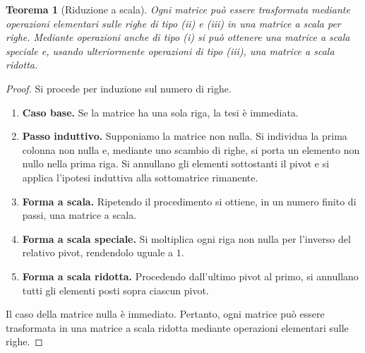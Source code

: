 \documentclass[11pt,a4paper]{article}
\theoremstyle{plain}
\newtheorem{teo}[prop]{Teorema}
\theoremstyle{definition}
\theoremstyle{remark}
\begin{document}
\begin{teo}[Riduzione a scala]
Ogni matrice può essere trasformata mediante operazioni elementari sulle righe di tipo (ii) e (iii) in una matrice a scala per righe. Mediante operazioni anche di tipo (i) si può ottenere una matrice a scala speciale e, usando ulteriormente operazioni di tipo (iii), una matrice a scala ridotta.
\end{teo}
\begin{proof}
Si procede per induzione sul numero di righe.

\begin{enumerate}
    \item \textbf{Caso base.} Se la matrice ha una sola riga, la tesi è immediata.

    \item \textbf{Passo induttivo.} Supponiamo la matrice non nulla. Si individua la prima colonna non nulla e, mediante uno scambio di righe, si porta un elemento non nullo nella prima riga. Si annullano gli elementi sottostanti il pivot e si applica l'ipotesi induttiva alla sottomatrice rimanente.

    \item \textbf{Forma a scala.} Ripetendo il procedimento si ottiene, in un numero finito di passi, una matrice a scala.

    \item \textbf{Forma a scala speciale.} Si moltiplica ogni riga non nulla per l'inverso del relativo pivot, rendendolo uguale a \(1\).

    \item \textbf{Forma a scala ridotta.} Procedendo dall'ultimo pivot al primo, si annullano tutti gli elementi posti sopra ciascun pivot.
\end{enumerate}

Il caso della matrice nulla è immediato. Pertanto, ogni matrice può essere trasformata in una matrice a scala ridotta mediante operazioni elementari sulle righe.
\end{proof}
\end{document}
